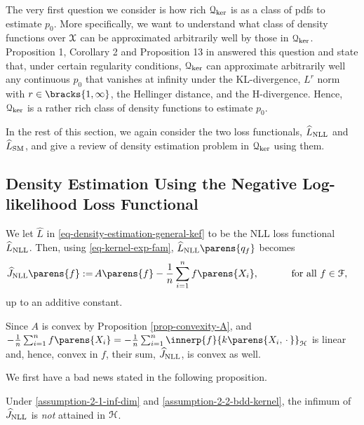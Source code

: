 The very first question we consider is how rich $\mathcal{Q}_{\ker}$ is as a class of pdfs to estimate $p_0$. More specifically, we want to understand what class of density functions over $\mathcal{X}$ can be approximated arbitrarily well by those in $\mathcal{Q}_{\ker}$. Proposition 1, Corollary 2 and Proposition 13 in \textcite{Sriperumbudur-density-estimation-inf-exp-family} answered this question and state that, under certain regularity conditions, 
$\mathcal{Q}_{\ker}$ can approximate arbitrarily well any continuous $p_0$ that vanishes at infinity under the KL-divergence, $L^r$ norm with $r \in \bracks{1, \infty}$, the Hellinger distance, and the H-divergence. Hence, $\mathcal{Q}_{\ker}$ is a rather rich class of density functions to estimate $p_0$. 

In the rest of this section, we again consider the two loss functionals, $\widehat{L}_{\mathrm{NLL}}$ and $\widehat{L}_{\mathrm{SM}}$, and give a review of density estimation problem in $\mathcal{Q}_{\ker}$ using them. 

\subsection{Density Estimation Using the Negative Log-likelihood Loss Functional}\label{subsection-nnl-kef}

We let $\widehat{L}$ in \eqref{eq-density-estimation-general-kef} to be the NLL loss functional $\widehat{L}_{\mathrm{NLL}}$. Then, using \eqref{eq-kernel-exp-fam}, $\widehat{L}_{\NLL} \parens{q_f}$ becomes 
\begin{align*}
	\widehat{J}_{\NLL} \parens{f} %
	:= & \, A \parens{f} - \frac{1}{n} \sum_{i=1}^n f \parens{X_i}, \qquad \quad \text{ for all } f \in \calF, 
\end{align*}
up to an additive constant. 

Since $A$ is convex by Proposition \ref{prop-convexity-A}, and $- \frac{1}{n} \sum_{i=1}^n f \parens{X_i} = - \frac{1}{n} \sum_{i=1}^n \innerp{f}{k \parens{X_i, \,\cdot\,}}_{\calH}$ is linear and, hence, convex in $f$, their sum, $\widehat{J}_{\mathrm{NLL}}$, is convex as well. 

We first have a bad news stated in the following proposition. 

\begin{proposition}\label{prop-no-mle-inf-exp-fam}
	Under \ref{assumption-2-1-inf-dim} and \ref{assumption-2-2-bdd-kernel}, the infimum of $\widehat{J}_{\mathrm{NLL}}$ is \emph{not} attained in $\mathcal{H}$. 
\end{proposition}

